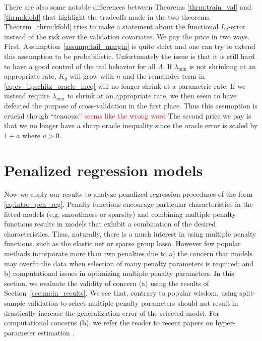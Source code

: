 \documentclass[12pt]{article} %
\theoremstyle{definition}
\newcommand{\textred}[1]{\textcolor{red}{#1}}
\begin{document}
There are also some notable differences between Theorems \ref{thrm:train_val} and \ref{thrm:kfold} that highlight the tradeoffs made in the two theorems.
Theorem~\ref{thrm:kfold} tries to make a statement about the functional $L_2$-error instead of the risk over the validation covariates.
We pay the price in two ways.
First, Assumption~\ref{assump:tail_margin} is quite strict and one can try to extend this assumption to be probabilistic.
Unfortunately the issue is that it is still hard to have a good control of the tail behavior for all $\Lambda$.
If $\lambda_{\min}$ is not shrinking at an appropriate rate, $K_0$ will grow with $n$ and the remainder term in \eqref{eq:cv_lipschitz_oracle_ineq} will no longer shrink at a parametric rate.
If we instead require $\lambda_{\min}$ to shrink at an appropriate rate, we then seem to have defeated the purpose of cross-validation in the first place.
Thus this assumption is crucial though ``tenuous.'' \textred{seems like the wrong word}
The second price we pay is that we no longer have a sharp oracle inequality since the oracle error is scaled by $1+a$ where $a > 0$.

\section{Penalized regression models}
\label{sec:examples}
Now we apply our results to analyze penalized regression procedures of the form \eqref{eq:intro_pen_reg}.
Penalty functions encourage particular characteristics in the fitted models (e.g. smoothness or sparsity) and combining multiple penalty functions results in models that exhibit a combination of the desired characteristics. 
Thus, naturally, there is a much interest in using multiple penalty functions, such as the elastic net or sparse group lasso.
However few popular methods incorporate more than two penalties due to a) the concern that models may overfit the data when selection of many penalty parameters is required; and b) computational issues in optimizing multiple penalty parameters. In this section, we evaluate the validity of concern (a) using the results of Section~\ref{sec:main_results}. We see that, contrary to popular wisdom, using split-sample validation to select multiple penalty parameters should not result in drastically increase the generalization error of the selected model. For computational concerns (b), we refer the reader to recent papers on hyper-parameter estimation \citep{bengio2000gradient, foo2008efficient, snoek2012practical}.
\end{document}
